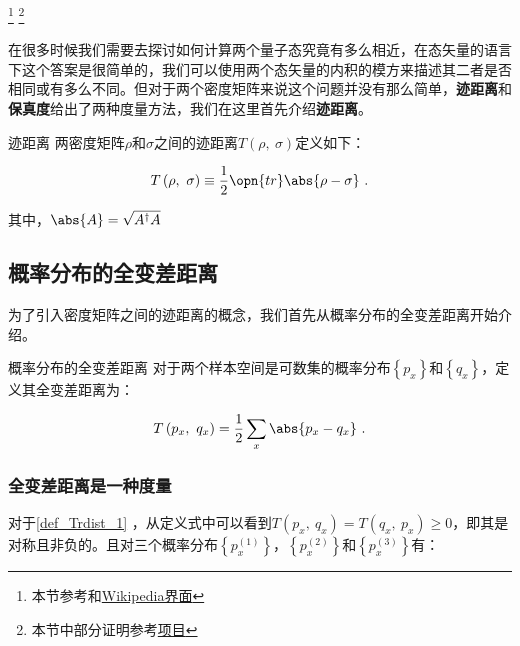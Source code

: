 


\footnote{本节参考\cite{量子信息}和\href{https://en.wikipedia.org/wiki/Trace_distance}{Wikipedia界面}}
\footnote{本节中部分证明参考\href{https://github.com/goropikari/SolutionQCQINielsenChuang}{项目}}


在很多时候我们需要去探讨如何计算两个量子态究竟有多么相近，在态矢量的语言下这个答案是很简单的，我们可以使用两个态矢量的内积的模方来描述其二者是否相同或有多么不同。但对于两个密度矩阵来说这个问题并没有那么简单，\textbf{迹距离}和\textbf{保真度}给出了两种度量方法，我们在这里首先介绍\textbf{迹距离}。

\begin{definition}{迹距离}\label{def_Trdist_1}
两密度矩阵$\rho$和$\sigma$之间的迹距离$T\left(\rho,~\sigma\right)$定义如下：

\begin{equation}
T\left(\rho,~\sigma\right) \equiv \frac{1}{2} \opn{tr}\abs{\rho - \sigma}~.
\end{equation}

其中，$\abs{A} = \sqrt{A^\dagger A}$

\end{definition}

\subsection{概率分布的全变差距离}

为了引入密度矩阵之间的迹距离的概念，我们首先从概率分布的全变差距离开始介绍。

\begin{definition}{概率分布的全变差距离}
对于两个样本空间是可数集的概率分布$\left\{ p_x \right\}$和$\left\{q_x\right\}$，定义其全变差距离为：

\begin{equation}\label{eq_Trdist_1}
T\left( p_x,~q_x \right) = \frac{1}{2}\sum_x\abs{p_x - q_x}~.
\end{equation}

\end{definition}

\subsubsection{全变差距离是一种度量}

对于\autoref{def_Trdist_1} ，从定义式中可以看到$T\left(p_x,~q_x\right) = T\left(q_x,~p_x\right)\geqslant 0$，即其是对称且非负的。且对三个概率分布$\left\{p_x^{(1)}\right\}$，$\left\{p_x^{(2)}\right\}$和$\left\{p_x^{(3)}\right\}$有：

